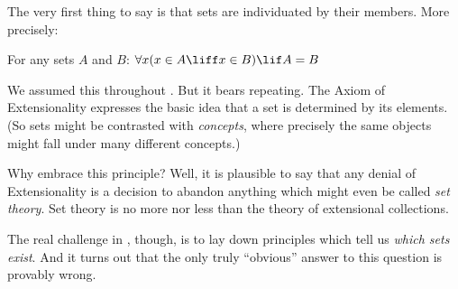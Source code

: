 \documentclass[../../../include/open-logic-section]{subfiles}
\begin{document}

The very first thing to say is that sets are individuated by their
members. More precisely:

\begin{axiom}[Extensionality]
For any sets $A$ and $B$: $\forall x(x \in A \liff x \in B) \lif A = B$
\end{axiom}

We assumed this throughout . But it bears
repeating. The Axiom of Extensionality expresses the basic idea that a
set is determined by its elements. (So sets might be contrasted with
\emph{concepts}, where precisely the same objects might fall under
many different concepts.) 

Why embrace this principle? Well, it is plausible to say that any
denial of Extensionality is a decision to abandon anything which might
even be called \emph{set theory}. Set theory is no more nor less than
the theory of extensional collections. 

The real challenge in , though, is to lay
down principles which tell us \emph{which sets exist}. And it turns
out that the only truly ``obvious'' answer to this question is
provably wrong.
\end{document}
